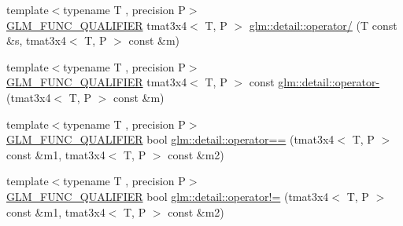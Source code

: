 \begin{DoxyCompactItemize}
\item 
{\footnotesize template$<$typename T , precision P$>$ }\\\hyperlink{setup_8hpp_a33fdea6f91c5f834105f7415e2a64407}{G\+L\+M\+\_\+\+F\+U\+N\+C\+\_\+\+Q\+U\+A\+L\+I\+F\+I\+ER} tmat3x4$<$ T, P $>$ \hyperlink{namespaceglm_1_1detail_aae2682062713853192bf8247d8552f61}{glm\+::detail\+::operator/} (T const \&s, tmat3x4$<$ T, P $>$ const \&m)
\item 
{\footnotesize template$<$typename T , precision P$>$ }\\\hyperlink{setup_8hpp_a33fdea6f91c5f834105f7415e2a64407}{G\+L\+M\+\_\+\+F\+U\+N\+C\+\_\+\+Q\+U\+A\+L\+I\+F\+I\+ER} tmat3x4$<$ T, P $>$ const \hyperlink{namespaceglm_1_1detail_afc0cccc2a524a9bece9675230f84a774}{glm\+::detail\+::operator-\/} (tmat3x4$<$ T, P $>$ const \&m)
\item 
{\footnotesize template$<$typename T , precision P$>$ }\\\hyperlink{setup_8hpp_a33fdea6f91c5f834105f7415e2a64407}{G\+L\+M\+\_\+\+F\+U\+N\+C\+\_\+\+Q\+U\+A\+L\+I\+F\+I\+ER} bool \hyperlink{namespaceglm_1_1detail_abb4ba3278baf2fbda2a0b922414a10e4}{glm\+::detail\+::operator==} (tmat3x4$<$ T, P $>$ const \&m1, tmat3x4$<$ T, P $>$ const \&m2)
\item 
{\footnotesize template$<$typename T , precision P$>$ }\\\hyperlink{setup_8hpp_a33fdea6f91c5f834105f7415e2a64407}{G\+L\+M\+\_\+\+F\+U\+N\+C\+\_\+\+Q\+U\+A\+L\+I\+F\+I\+ER} bool \hyperlink{namespaceglm_1_1detail_a94700385095c9db8b0f706ba164dff4d}{glm\+::detail\+::operator!=} (tmat3x4$<$ T, P $>$ const \&m1, tmat3x4$<$ T, P $>$ const \&m2)
\end{DoxyCompactItemize}
